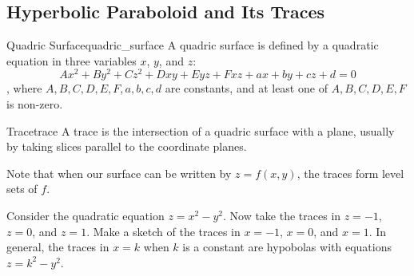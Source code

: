 
\subsection{Hyperbolic Paraboloid and Its Traces}

\begin{definition}{Quadric Surface}{quadric_surface}
A quadric surface is defined by a quadratic equation in three variables $x$, $y$, and $z$:
\[
Ax^2 + By^2 + Cz^2 + Dxy + Eyz + Fxz + ax + by + cz + d = 0
\]
, where $A, B, C, D, E, F, a, b, c, d$ are constants, and at least one of $A, B, C, D, E, F$ is non-zero.
\end{definition}

\begin{definition}{Trace}{trace}
A trace is the intersection of a quadric surface with a plane, usually by taking slices parallel to the coordinate planes.

Note that when our surface can be written by $z = f(x, y)$, the traces form level sets of $f$.
\end{definition}

\begin{example}
Consider the quadratic equation $z = x^2 - y^2$.
Now take the traces in $z = -1$, $z = 0$, and $z = 1$.
Make a sketch of the traces in $x = -1$, $x = 0$, and $x = 1$.
In general, the traces in $x = k$ when $k$ is a constant are hypobolas with equations $z = k^2 - y^2$.

\end{example}

